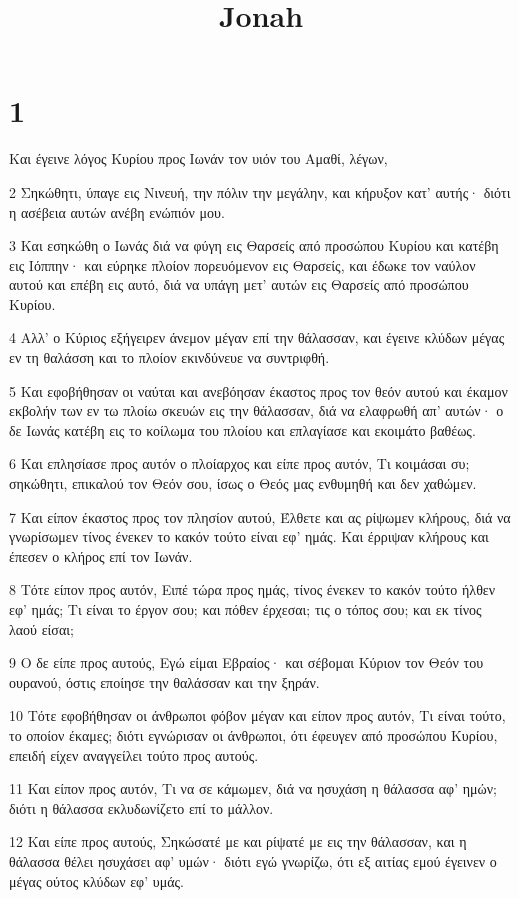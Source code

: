 

\title{Jonah}


\chapter{1}

\par Και έγεινε λόγος Κυρίου προς Ιωνάν τον υιόν του Αμαθί, λέγων,
\par 2 Σηκώθητι, ύπαγε εις Νινευή, την πόλιν την μεγάλην, και κήρυξον κατ' αυτής· διότι η ασέβεια αυτών ανέβη ενώπιόν μου.
\par 3 Και εσηκώθη ο Ιωνάς διά να φύγη εις Θαρσείς από προσώπου Κυρίου και κατέβη εις Ιόππην· και εύρηκε πλοίον πορευόμενον εις Θαρσείς, και έδωκε τον ναύλον αυτού και επέβη εις αυτό, διά να υπάγη μετ' αυτών εις Θαρσείς από προσώπου Κυρίου.
\par 4 Αλλ' ο Κύριος εξήγειρεν άνεμον μέγαν επί την θάλασσαν, και έγεινε κλύδων μέγας εν τη θαλάσση και το πλοίον εκινδύνευε να συντριφθή.
\par 5 Και εφοβήθησαν οι ναύται και ανεβόησαν έκαστος προς τον θεόν αυτού και έκαμον εκβολήν των εν τω πλοίω σκευών εις την θάλασσαν, διά να ελαφρωθή απ' αυτών· ο δε Ιωνάς κατέβη εις το κοίλωμα του πλοίου και επλαγίασε και εκοιμάτο βαθέως.
\par 6 Και επλησίασε προς αυτόν ο πλοίαρχος και είπε προς αυτόν, Τι κοιμάσαι συ; σηκώθητι, επικαλού τον Θεόν σου, ίσως ο Θεός μας ενθυμηθή και δεν χαθώμεν.
\par 7 Και είπον έκαστος προς τον πλησίον αυτού, Έλθετε και ας ρίψωμεν κλήρους, διά να γνωρίσωμεν τίνος ένεκεν το κακόν τούτο είναι εφ' ημάς. Και έρριψαν κλήρους και έπεσεν ο κλήρος επί τον Ιωνάν.
\par 8 Τότε είπον προς αυτόν, Ειπέ τώρα προς ημάς, τίνος ένεκεν το κακόν τούτο ήλθεν εφ' ημάς; Τι είναι το έργον σου; και πόθεν έρχεσαι; τις ο τόπος σου; και εκ τίνος λαού είσαι;
\par 9 Ο δε είπε προς αυτούς, Εγώ είμαι Εβραίος· και σέβομαι Κύριον τον Θεόν του ουρανού, όστις εποίησε την θαλάσσαν και την ξηράν.
\par 10 Τότε εφοβήθησαν οι άνθρωποι φόβον μέγαν και είπον προς αυτόν, Τι είναι τούτο, το οποίον έκαμες; διότι εγνώρισαν οι άνθρωποι, ότι έφευγεν από προσώπου Κυρίου, επειδή είχεν αναγγείλει τούτο προς αυτούς.
\par 11 Και είπον προς αυτόν, Τι να σε κάμωμεν, διά να ησυχάση η θάλασσα αφ' ημών; διότι η θάλασσα εκλυδωνίζετο επί το μάλλον.
\par 12 Και είπε προς αυτούς, Σηκώσατέ με και ρίψατέ με εις την θάλασσαν, και η θάλασσα θέλει ησυχάσει αφ' υμών· διότι εγώ γνωρίζω, ότι εξ αιτίας εμού έγεινεν ο μέγας ούτος κλύδων εφ' υμάς.
